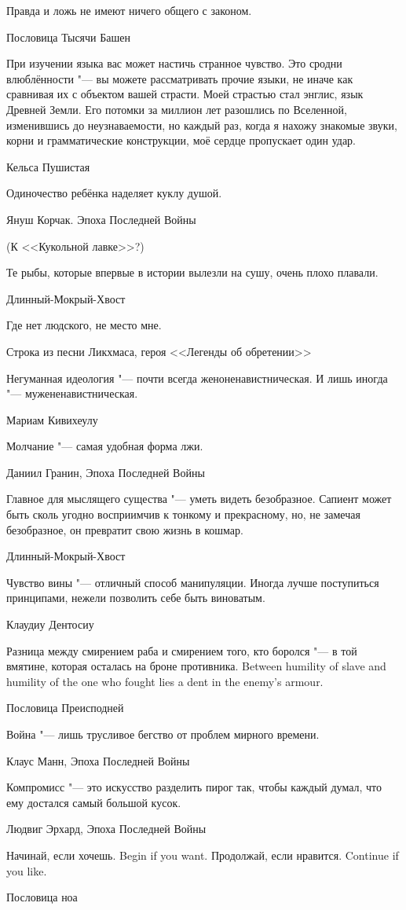\epigraph
{Правда и ложь не имеют ничего общего с законом.}
{Пословица Тысячи Башен}

\epigraph
{При изучении языка вас может настичь странное чувство.
Это сродни влюблённости "--- вы можете рассматривать прочие языки, не иначе как сравнивая их с объектом вашей страсти.
Моей страстью стал энглис, язык Древней Земли.
Его потомки за миллион лет разошлись по Вселенной, изменившись до неузнаваемости, но каждый раз, когда я нахожу знакомые звуки, корни и грамматические конструкции, моё сердце пропускает один удар.}
{Кельса Пушистая}

\epigraph
{Одиночество ребёнка наделяет куклу душой.}
{Януш Корчак.
Эпоха Последней Войны}
(К <<Кукольной лавке>>?)

\epigraph{Те рыбы, которые впервые в истории вылезли на сушу, очень плохо плавали.}
{Длинный-Мокрый-Хвост}

\epigraph
{Где нет людского, не место мне.}
{Строка из песни Ликхмаса, героя <<Легенды об обретении>>}

\epigraph
{Негуманная идеология "--- почти всегда женоненавистническая.
И лишь иногда "--- мужененавистническая.}
{Мариам Кивихеулу}

\epigraph
{Молчание "--- самая удобная форма лжи.}
{Даниил Гранин, Эпоха Последней Войны}

\epigraph
{Главное для мыслящего существа "--- уметь видеть безобразное.
Сапиент может быть сколь угодно восприимчив к тонкому и прекрасному, но, не замечая безобразное, он превратит свою жизнь в кошмар.}
{Длинный-Мокрый-Хвост}

\epigraph
{Чувство вины "--- отличный способ манипуляции.
Иногда лучше поступиться принципами, нежели позволить себе быть виноватым.}
{Клаудиу Дентосиу}

\epigraph{
{Разница между смирением раба и смирением того, кто боролся "--- в той вмятине, которая осталась на броне противника.}
{Between humility of slave and humility of the one who fought lies a dent in the enemy's armour.}
}{Пословица Преисподней}

\epigraph
{Война "--- лишь трусливое бегство от проблем мирного времени.}
{Клаус Манн, Эпоха Последней Войны}

\epigraph
{Компромисс "--- это искусство разделить пирог так, чтобы каждый думал, что ему достался самый большой кусок.}
{Людвиг Эрхард, Эпоха Последней Войны}

\epigraph{
{Начинай, если хочешь.}
{Begin if you want.}
{Продолжай, если нравится.}
{Continue if you like.}
}{Пословица ноа}

